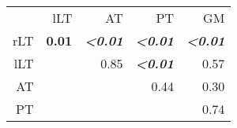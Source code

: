 \begin{table}[H]
\begin{tableframe}
{\begin{minipage}{\linewidth}
\begin{tabular}{rrrrr}
		        \addlinespace
				\multicolumn{5}{c}{\textbf{ADC$_{z}$ $\times$ $10^{-9}m^2/s$}}\\
				\toprule
		              & lLT  & AT    & PT    & GM \\
		        \midrule
		        rLT  & \textbf{0.01}  & \textbf{\emph{<0.01}}  & \textbf{\emph{<0.01}}  & \textbf{\emph{<0.01}} \\
		        lLT  &       & 0.85  & \textbf{\emph{<0.01}}  & 0.57 \\
		        AT    &       &       & 0.44  & 0.30 \\
		        PT    &       &       &       & 0.74 \\
		        \bottomrule
		        \end{tabular}%
				\end{minipage}%
				\label{tab:chap5exp1_adc single ttest}%
				
}
\end{tableframe}
\end{table}
